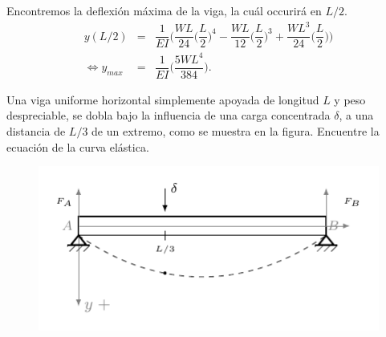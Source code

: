 \documentclass{beamer}
\begin{document}
\begin{frame}[t]
	\begin{exampleblock}{}
		Encontremos la deflexión máxima de la viga, la cuál occurirá en \(L/2\).
		\[
			\begin{array}{rcl}
				y(L/2) & = & \dfrac{1}{EI} \bigg(\dfrac{WL}{24} \Big(\dfrac{L}{2}\Big) ^4- \dfrac{WL}{12} \Big(\dfrac{L}{2}\Big) ^3+ \dfrac{WL^3}{24} \Big(\dfrac{L}{2}\Big)\bigg) \\[6mm]
				\iff y_{max} & = & \dfrac{1}{EI} \bigg(\dfrac{5WL^4}{384}\bigg).
			\end{array}
		\]
	\end{exampleblock}

	\begin{example}
		Una viga uniforme horizontal simplemente apoyada de longitud \(L\) y peso despreciable, se dobla bajo la influencia de una carga concentrada \(\delta\), a una distancia de \(L/3\) de un extremo, como se muestra en la figura. Encuentre la ecuación de la curva elástica.
	\end{example}
\end{frame}

\begin{frame}[t]
	\begin{figure}[ht]
		\centering
		\includegraphics[width= \linewidth]{IMAGENES_VIGAS/5/tikz.pdf}
	\end{figure}
\end{frame}
\end{document}
